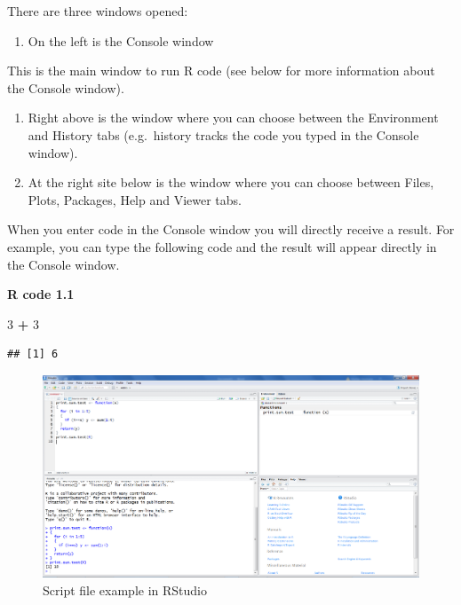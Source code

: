 \documentclass[]{book}
\newenvironment{Shaded}{\begin{snugshade}}{\end{snugshade}}
\newcommand{\DecValTok}[1]{\textcolor[rgb]{0.00,0.00,0.81}{#1}}
\newcommand{\StringTok}[1]{\textcolor[rgb]{0.31,0.60,0.02}{#1}}
\newcommand{\OperatorTok}[1]{\textcolor[rgb]{0.81,0.36,0.00}{\textbf{#1}}}
\providecommand{\tightlist}{%
  \setlength{\itemsep}{0pt}\setlength{\parskip}{0pt}}
\theoremstyle{definition}
\theoremstyle{definition}
\theoremstyle{definition}
\theoremstyle{remark}
\begin{document}
There are three windows opened:

\begin{enumerate}
\def\labelenumi{\arabic{enumi}.}
\tightlist
\item
  On the left is the Console window
\end{enumerate}

This is the main window to run R code (see below for more information
about the Console window).

\begin{enumerate}
\def\labelenumi{\arabic{enumi}.}
\setcounter{enumi}{1}
\tightlist
\item
  Right above is the window where you can choose between the Environment
  and History tabs (e.g.~history tracks the code you typed in the
  Console window).
\item
  At the right site below is the window where you can choose between
  Files, Plots, Packages, Help and Viewer tabs.
\end{enumerate}

When you enter code in the Console window you will directly receive a
result. For example, you can type the following code and the result will
appear directly in the Console window.

\textbf{R code 1.1}

\begin{Shaded}
\begin{Highlighting}[]
\DecValTok{3} \OperatorTok{+}\StringTok{ }\DecValTok{3}
\end{Highlighting}
\end{Shaded}

\begin{verbatim}
## [1] 6
\end{verbatim}

\begin{figure}

{\centering \includegraphics[width=0.9\linewidth]{images/fig1.11} 

}

\caption{Script file example in RStudio}\label{fig:fig11}
\end{figure}
\end{document}
